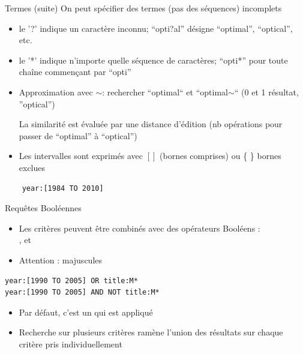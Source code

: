 \begin{frame}[fragile]{Termes (suite)}
  On peut spécifier des termes (pas des séquences) incomplets
  \begin{itemize}
      \setlength{\itemsep}{8pt}
    \item le '?' indique un caractère inconnu;  ``opti?al'' désigne ``optimal'', ``optical'', etc.
      
    \item le '*' indique n'importe quelle séquence de caractères; 
      ``opti*'' pour toute chaîne commençant par ``opti''
    \item Approximation avec $\sim$: rechercher ``optimal`` et ``optimal$\sim$`` (0 et 1 résultat, ''optical'')
    
       La similarité est évaluée par une distance d'édition 
      (nb opérations pour passer de ``optimal'' à ``optical'')
  
    \item Les intervalles sont exprimés avec  $[ ]$ (bornes comprises) ou  \{ \} bornes exclues
  \end{itemize}
\begin{verbatim}
    year:[1984 TO 2010]
\end{verbatim}
\end{frame}

\begin{frame}[fragile]{Requêtes Booléennes}

  \begin{itemize}
    \item Les critères peuvent être combinés avec des \alert{opérateurs
      Booléens} :\\
      ,  et 
    \item Attention : majuscules
  \end{itemize}
\begin{verbatim}
year:[1990 TO 2005] OR title:M*
year:[1990 TO 2005] AND NOT title:M*
\end{verbatim}
   
\begin{itemize}
  \item Par défaut, c'est un  qui est appliqué
  \item Recherche sur plusieurs critères ramène l'union des résultats sur chaque
    critère pris individuellement
\end{itemize}
\end{frame}

